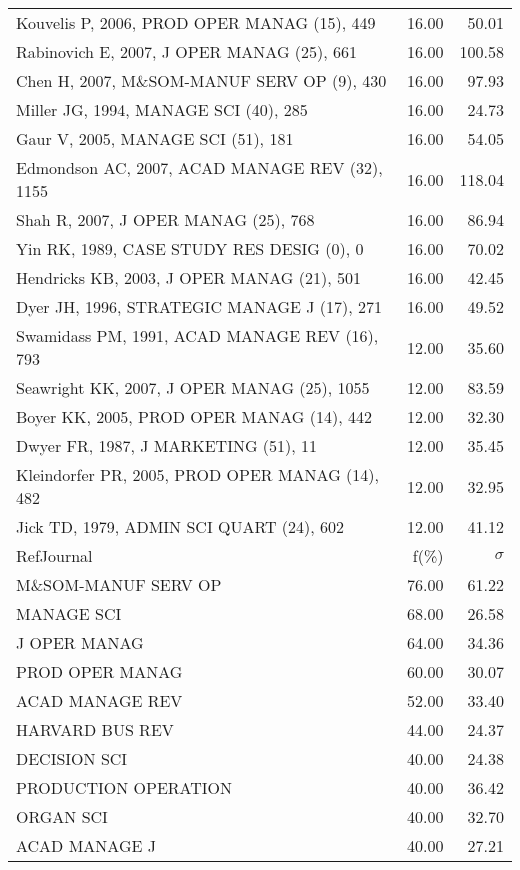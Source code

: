 \documentclass[a4paper,11pt]{report}
\begin{document}
\begin{landscape}
\begin{table}[!ht]
{\begin{tabular}{|l r r|}
Kouvelis P, 2006, PROD OPER MANAG (15), 449 & 16.00 & 50.01\\
Rabinovich E, 2007, J OPER MANAG (25), 661 & 16.00 & 100.58\\
Chen H, 2007, M\&SOM-MANUF SERV OP (9), 430 & 16.00 & 97.93\\
Miller JG, 1994, MANAGE SCI (40), 285 & 16.00 & 24.73\\
Gaur V, 2005, MANAGE SCI (51), 181 & 16.00 & 54.05\\
Edmondson AC, 2007, ACAD MANAGE REV (32), 1155 & 16.00 & 118.04\\
Shah R, 2007, J OPER MANAG (25), 768 & 16.00 & 86.94\\
Yin RK, 1989, CASE STUDY RES DESIG (0), 0 & 16.00 & 70.02\\
Hendricks KB, 2003, J OPER MANAG (21), 501 & 16.00 & 42.45\\
Dyer JH, 1996, STRATEGIC MANAGE J (17), 271 & 16.00 & 49.52\\
Swamidass PM, 1991, ACAD MANAGE REV (16), 793 & 12.00 & 35.60\\
Seawright KK, 2007, J OPER MANAG (25), 1055 & 12.00 & 83.59\\
Boyer KK, 2005, PROD OPER MANAG (14), 442 & 12.00 & 32.30\\
Dwyer FR, 1987, J MARKETING (51), 11 & 12.00 & 35.45\\
Kleindorfer PR, 2005, PROD OPER MANAG (14), 482 & 12.00 & 32.95\\
Jick TD, 1979, ADMIN SCI QUART (24), 602 & 12.00 & 41.12\\
\hline
\hline
RefJournal & f(\%) & $\sigma$\\
\hline
M\&SOM-MANUF SERV OP & 76.00 & 61.22\\
MANAGE SCI & 68.00 & 26.58\\
J OPER MANAG & 64.00 & 34.36\\
PROD OPER MANAG & 60.00 & 30.07\\
ACAD MANAGE REV & 52.00 & 33.40\\
HARVARD BUS REV & 44.00 & 24.37\\
DECISION SCI & 40.00 & 24.38\\
PRODUCTION OPERATION & 40.00 & 36.42\\
ORGAN SCI & 40.00 & 32.70\\
ACAD MANAGE J & 40.00 & 27.21\\
\hline
\end{tabular}
}
\end{table}

\end{landscape}
\end{document}
